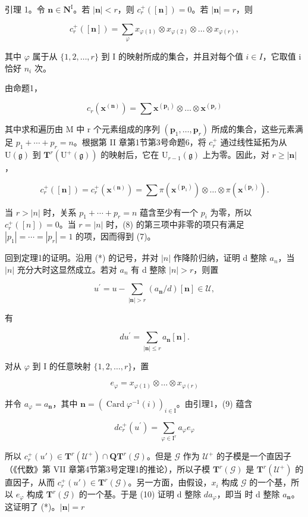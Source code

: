 引理 1。令 \(\mathbf{n} \in \mathbf{N}^{\mathrm{I}}\)。若 \(|\mathbf{n}| < r\)，则 \(c_{r}^{+}([ \mathbf{n}]) = 0\)。若 \(|\mathbf{n}| = r\)，则

\[
c _ {r} ^ {+} ([ \mathbf {n} ]) = \sum_ {\varphi} x _ {\varphi (1)} \otimes x _ {\varphi (2)} \otimes \dots \otimes x _ {\varphi (r)},\tag{7}
\]

其中 \(\varphi\) 属于从 \(\{1,2,\ldots,r\}\) 到 I 的映射所成的集合，并且对每个值 \(i\in I\)，它取值 i 恰好 \(n_{i}\) 次。

由命题1，

\[
c _ {r} \left(\mathbf {x} ^ {(\mathbf {n})}\right) = \sum \mathbf {x} ^ {\left(\mathbf {p} _ {1}\right)} \otimes \dots \otimes \mathbf {x} ^ {\left(\mathbf {p} _ {r}\right)}
\]

其中求和遍历由 M 中 r 个元素组成的序列 \((\mathbf{p}_{1},\ldots,\mathbf{p}_{r})\) 所成的集合，这些元素满足 \(p_{1}+\cdots+p_{r}=n\)。根据第 II 章第1节第3号命题6，将 \(c_{r}^{+}\) 通过线性延拓为从 \(\mathrm{U}(\mathfrak{g})\) 到 \(\mathbf{T}^{r}(\mathrm{U}^{+}(\mathfrak{g}))\) 的映射后，它在 \(\mathrm{U}_{r-1}(\mathfrak{g})\) 上为零。因此，对 \(r\geq|\mathbf{n}|\)，

\[
c _ {r} ^ {+} ([ \mathbf {n} ]) = c _ {r} ^ {+} (\mathbf {x} ^ {(\mathbf {n})}) = \sum \pi (\mathbf {x} ^ {(\mathbf {p} _ {1})}) \otimes \dots \otimes \pi (\mathbf {x} ^ {(\mathbf {p} _ {r})}).\tag{8}
\]

当 \(r > |n|\) 时，关系 \(p_{1} + \cdots + p_{r} = n\) 蕴含至少有一个 \(p_{i}\) 为零，所以 \(c_{r}^{+}([n]) = 0\)。当 \(r = |n|\) 时，(8) 的第三项中非零的项只有满足 \(|p_{1}| = \cdots = |p_{r}| = 1\) 的项，因而得到 (7)。

回到定理1的证明。沿用 (*) 的记号，并对 \(|n|\) 作降阶归纳，证明 d 整除 \(a_{n}\)，当 \(|n|\) 充分大时这显然成立。若对 \(a_{n}\) 有 d 整除 \(|n| > r\)，则置

\[
u ^ {\prime} = u - \sum_ {| \mathbf {n} | > r} (a _ {\mathbf {n}} / d) [ \mathbf {n} ] \in \mathcal {U},
\]

有

\[
d u ^ {\prime} = \sum_ {| \mathbf {n} | \leq r} a _ {\mathbf {n}} [ \mathbf {n} ].\tag{9}
\]

对从 \(\varphi\) 到 I 的任意映射 \(\{1,2,\ldots,r\}\)，置

\[
e _ {\varphi} = x _ {\varphi (1)} \otimes \dots \otimes x _ {\varphi (r)}
\]

并令 \(a_{\varphi} = a_{\mathbf{n}}\)，其中 \(\mathbf{n} = (\operatorname{Card}\varphi^{-1}(i))_{i\in \mathrm{I}}\)。由引理1，(9) 蕴含

\[
d c _ {r} ^ {+} (u ^ {\prime}) = \sum_ {\varphi \in \mathrm{I} ^ {r}} a _ {\varphi} e _ {\varphi}\tag{10}
\]

所以 \(c_r^+(u') \in \mathbf{T}^r(\mathcal{U}^+) \cap \mathbf{Q}\mathbf{T}^r(\mathcal{G})\)。但是 \(\mathcal{G}\) 作为 \(\mathcal{U}^+\) 的子模是一个直因子（《代数》第 VII 章第4节第3号定理1的推论），所以子模 \(\mathbf{T}^r(\mathcal{G})\) 是 \(\mathbf{T}^r(\mathcal{U}^+)\) 的直因子，从而 \(c_r^+(u') \in \mathbf{T}^r(\mathcal{G})\)。另一方面，由假设，\(x_i\) 构成 \(\mathcal{G}\) 的一个基，所以 \(e_\varphi\) 构成 \(\mathbf{T}^r(\mathcal{G})\) 的一个基。于是 (10) 证明 d 整除 \(d\)\(a_\varphi\)，即当  时 d 整除 \(a_{\mathbf{n}}\)。这证明了 (*)。\(|\mathbf{n}| = r\)